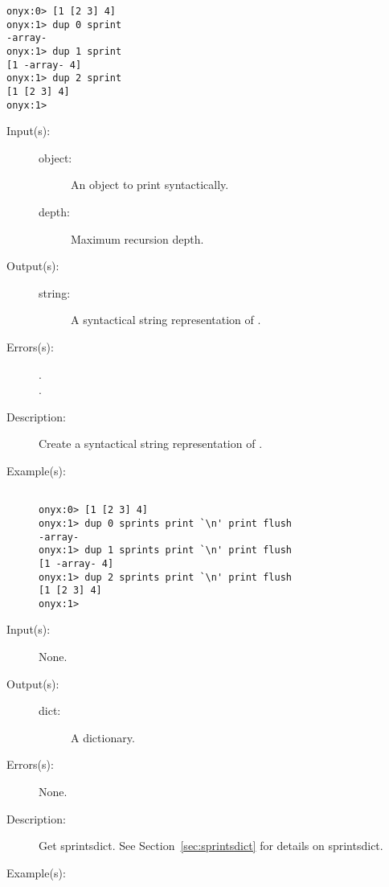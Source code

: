 \begin{description}
\begin{description}
\begin{verbatim}
onyx:0> [1 [2 3] 4]
onyx:1> dup 0 sprint
-array-
onyx:1> dup 1 sprint
[1 -array- 4]
onyx:1> dup 2 sprint
[1 [2 3] 4]
onyx:1>
		\end{verbatim}
	\end{description}
\label{systemdict:sprints}
\item[{\onyxop{object depth}{sprints}{string}}: ]
	\begin{description}\item[]
	\item[Input(s): ]
		\begin{description}\item[]
		\item[object: ]
			An object to print syntactically.
		\item[depth: ]
			Maximum recursion depth.
		\end{description}
	\item[Output(s): ]
		\begin{description}\item[]
		\item[string: ]
			A syntactical string representation of .
		\end{description}
	\item[Errors(s): ]
		\begin{description}\item[]
		\item[.]
		\item[.]
		\end{description}
	\item[Description: ]
		Create a syntactical string representation of .
	\item[Example(s): ]\begin{verbatim}

onyx:0> [1 [2 3] 4]
onyx:1> dup 0 sprints print `\n' print flush
-array-
onyx:1> dup 1 sprints print `\n' print flush
[1 -array- 4]
onyx:1> dup 2 sprints print `\n' print flush
[1 [2 3] 4]
onyx:1>
		\end{verbatim}
	\end{description}
\label{systemdict:sprintsdict}
\item[{\onyxop{--}{sprintsdict}{dict}}: ]
	\begin{description}\item[]
	\item[Input(s): ] None.
	\item[Output(s): ]
		\begin{description}\item[]
		\item[dict: ]
			A dictionary.
		\end{description}
	\item[Errors(s): ] None.
	\item[Description: ]
		Get sprintsdict.  See Section~\ref{sec:sprintsdict} for details
		on sprintsdict.
	\item[Example(s): ]\begin{verbatim}


\end{verbatim}
\end{description}
\end{description}
